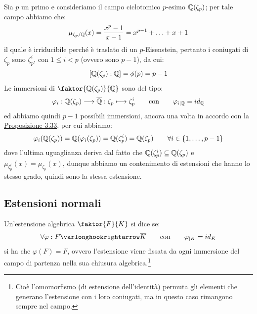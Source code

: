 \documentclass[11pt]{scrartcl}
\begin{document}
\begin{example}
    Sia $p$ un primo e consideriamo il campo ciclotomico $p$-esimo $\mathbb Q(\zeta_p)$; per tale campo abbiamo che:
    \[ \mu_{\zeta_p/\mathbb Q} (x) = \frac{x^p - 1}{x -1} = x^{p-1} + \ldots + x + 1
        \] 
    il quale è irriducibile perché è traslato di un $p$-Eisenstein, pertanto i coniugati di $\zeta_p$ sono $\zeta_p^i$, con $1 \leq i < p$ (ovvero sono $p-1$), da cui:
    \[ [\mathbb Q(\zeta_p) : \mathbb Q] = \phi(p) = p - 1 
        \]
    Le immersioni di $\faktor{\QQ(\zeta_p)}{\QQ}$ sono del tipo:
    \[ \varphi_i : \mathbb Q(\zeta_p) \longrightarrow \overline {\mathbb Q} : \zeta_p \longmapsto \zeta_p^i \qquad \text{con} \qquad \varphi_{i|\mathbb Q} = id_\mathbb Q
        \]
    ed abbiamo quindi $p - 1$ possibili immersioni, ancora una volta in accordo con la \hyperref[3.33]{Proposizione 3.33}, per cui abbiamo:
    \[ \varphi_i(\mathbb Q(\zeta_p)) = \mathbb Q(\varphi_i(\zeta_p)) = \mathbb Q(\zeta_p^i) = \mathbb Q(\zeta_p) \qquad \forall i \in \{1,\ldots,p-1\}
        \]
    dove l'ultima uguaglianza deriva dal fatto che $\mathbb Q(\zeta_p^i) \subseteq \mathbb Q(\zeta_p)$ e $\mu_{\zeta_p^i}(x) = \mu_{\zeta_p}(x)$, dunque abbiamo un contenimento di estensioni
    che hanno lo stesso grado, quindi sono la stessa estensione.
\end{example}

\newpage
\subsection{Estensioni normali}

\begin{definition}
    Un'estensione algebrica $\faktor{F}{K}$ si dice  se:
    \[ \forall \varphi : F \varlonghookrightarrow \overline K \qquad \text{con} \qquad \varphi_{|K} = id_K
        \]
    si ha che $\varphi(F) = F$, ovvero l'estensione viene fissata da ogni immersione del campo di partenza nella
    sua chiusura algebrica.\footnote{Cioè l'omomorfismo (di estensione dell'identità) permuta gli elementi che generano l'estensione con i loro coniugati, ma in questo caso rimangono sempre nel campo.}
\end{definition}
\end{document}
